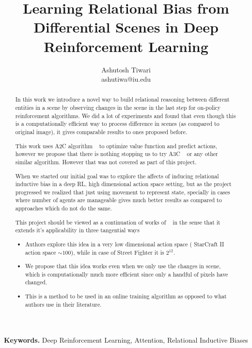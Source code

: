 \documentclass[english]{sobraep}
\title{Learning Relational Bias from Differential Scenes in Deep Reinforcement Learning}
\author{Ashutosh Tiwari\\
	\normalsize ashutiwa@iu.edu
}
\begin{document}
\maketitle


\begin{abstract}
    In this work we introduce a novel way to build relational reasoning between different entities in a scene by observing changes in the scene in the last step for on-policy reinforcement algorithms. We did a lot of experiments and found that even though this is a computationally efficient way to process difference in scenes (as compared to original image), it gives comparable results to ones proposed before.
    
    This work uses A2C algorithm ~\cite{DBLP:journals/corr/abs-1802-01561} to optimize value function and predict actions, however we propose that there is nothing stopping us to try A3C ~\cite{DBLP:journals/corr/MnihBMGLHSK16} or any other similar algorithm. However that was not covered as part of this project.
    
    When we started our initial goal was to explore the affects of inducing relational inductive bias in a deep RL, high dimensional action space setting, but as the project progressed we realized that just using movement to represent state, specially in cases where number of agents are manageable gives much better results as compared to approaches which do not do the same.
    
    This project should be viewed as a continuation of works of ~\cite{zambaldi2018deep} in the sense that it extends it's applicability in three tangential ways \begin{itemize}
	    \item Authors explore this idea in a very low dimensional action space ( StarCraft II action space $\sim 100$), while in case of Street Fighter it is $2^{12}$.
	    \item We propose that this idea works even when we only use the changes in scene, which is computationally much more efficient since only a handful of pixels have changed.
	    \item This is a method to be used in an online training algorithm as opposed to what authors use in their literature.
	\end{itemize}  
\end{abstract}
\noindent \textbf{Keywords.} Deep Reinforcement Learning, Attention, Relational Inductive Biases

\end{document}
